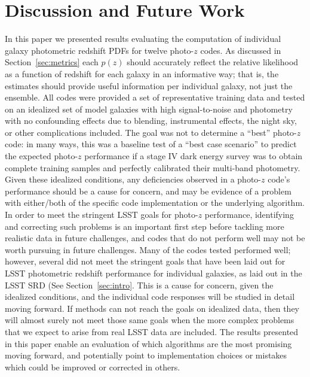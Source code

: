 \section{Discussion and Future Work}
\label{sec:discussion}
In this paper we presented results evaluating the computation of individual galaxy photometric redshift PDFs for twelve photo-$z$ codes.  As discussed in Section~\ref{sec:metrics} each $p(z)$ should accurately reflect the relative likelihood as a function of redshift for each galaxy in an informative way; that is, the estimates should provide useful information per individual galaxy, not just the ensemble.  All codes were provided a set of representative training data and tested on an idealized set of model galaxies with high signal-to-noise and photometry with no confounding effects due to blending, instrumental effects, the night sky, or other complications included.  The goal was not to determine a ``best'' photo-$z$ code: in many ways, this was a baseline test of a ``best case scenario'' to predict the expected photo-$z$ performance if a stage IV dark energy survey was to obtain complete training samples and perfectly calibrated their multi-band photometry.  Given these idealized conditions, any deficiencies observed in a photo-$z$ code's performance should be a cause for concern, and may be evidence of a problem with either/both of the specific code implementation or the underlying algorithm.  In order to meet the stringent LSST goals for photo-$z$ performance, identifying and correcting such problems is an important first step before tackling more realistic data in future challenges, and codes that do not perform well may not be worth pursuing in future challenges.  Many of the codes tested performed well; however, several did not meet the stringent goals that have been laid out for LSST photometric redshift performance for individual galaxies, as laid out in the LSST SRD (See Section~\ref{sec:intro}.  This is a cause for concern, given the idealized conditions, and the individual code responses will be studied in detail moving forward.  If methods can not reach the goals on idealized data, then they will almost surely not meet those same goals when the more complex problems that we expect to arise from real LSST data are included.  The results presented in this paper enable an evaluation of which algorithms are the most promising moving forward, and potentially point to implementation choices or mistakes which could be improved or corrected in others.

